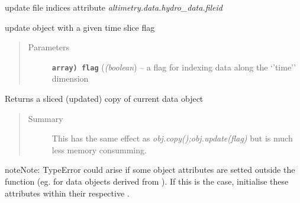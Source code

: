 \documentclass[letterpaper,10pt,english]{sphinxmanual}
\begin{document}
\begin{fulllineitems}
\begin{fulllineitems}
\label{altimetry.data:altimetry.data.hydro_data.update_fid_list}
update file indices attribute \emph{altimetry.data.hydro\_data.fileid}

\end{fulllineitems}


\begin{fulllineitems}
\label{altimetry.data:altimetry.data.hydro_data.update_with_slice}
update object with a given time slice flag
\begin{quote}\begin{description}
\item[{Parameters}] \leavevmode
\textbf{\texttt{array) flag}} (\emph{(boolean}) -- a flag for indexing data along the `'time'' dimension

\end{description}\end{quote}

\end{fulllineitems}


\begin{fulllineitems}
\label{altimetry.data:altimetry.data.hydro_data.updated_copy}
Returns a sliced (updated) copy of current data object
\begin{quote}\begin{description}
\item[{Summary}] \leavevmode
This has the same effect as \emph{obj.copy();obj.update(flag)} but is much less memory consumming.

\end{description}\end{quote}

\begin{notice}{note}{Note:}
TypeError could arise if some object attributes are setted outside the  function (eg. for data objects derived from ). If this is the case, initialise these attributes within their respective .
\end{notice}


\end{fulllineitems}
\end{fulllineitems}
\end{document}
